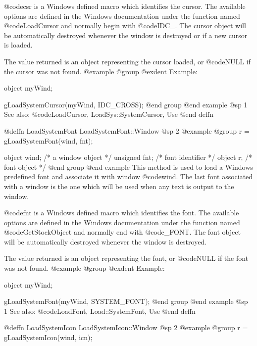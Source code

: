 @code{csr} is a Windows defined macro which identifies the cursor.  The
available options are defined in the Windows documentation under the
function named @code{LoadCursor} and normally begin with @code{IDC_}.  The
cursor object will be automatically destroyed whenever the window is
destroyed or if a new cursor is loaded.

The value returned is an object representing the cursor loaded, or
@code{NULL} if the cursor was not found.
@example
@group
@exdent Example:

object  myWind;

gLoadSystemCursor(myWind, IDC_CROSS);
@end group
@end example
@sp 1
See also:  @code{LoadCursor, LoadSys::SystemCursor, Use}
@end deffn











@deffn {LoadSystemFont} LoadSystemFont::Window
@sp 2
@example
@group
r = gLoadSystemFont(wind, fnt);

object   wind;  /*  a window object  */
unsigned fnt;   /*  font identifier  */
object   r;     /*  font object      */
@end group
@end example
This method is used to load a Windows predefined font and associate it
with window @code{wind}.  The last font associated with a window is the
one which will be used when any text is output to the window.

@code{fnt} is a Windows defined macro which identifies the font.  The
available options are defined in the Windows documentation under the
function named @code{GetStockObject} and normally end with @code{_FONT}.
The font object will be automatically destroyed whenever the window is
destroyed.

The value returned is an object representing the font, or
@code{NULL} if the font was not found.
@example
@group
@exdent Example:

object  myWind;

gLoadSystemFont(myWind, SYSTEM_FONT);
@end group
@end example
@sp 1
See also:  @code{LoadFont, Load::SystemFont, Use}
@end deffn
















@deffn {LoadSystemIcon} LoadSystemIcon::Window
@sp 2
@example
@group
r = gLoadSystemIcon(wind, icn);

